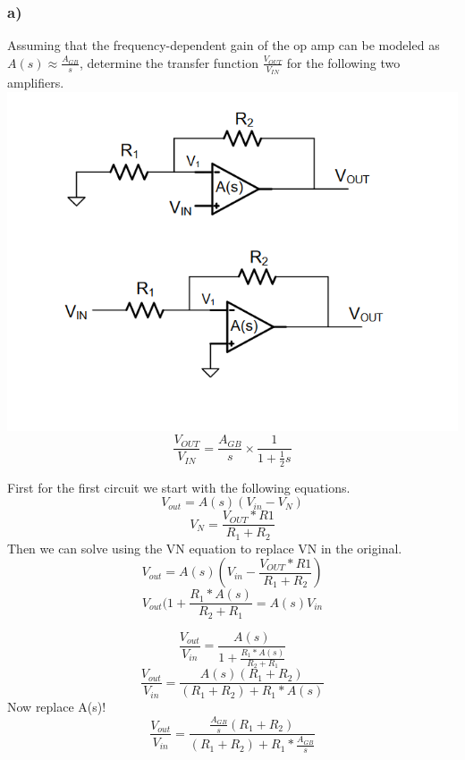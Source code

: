 \documentclass[10pt,a4paper]{article}
\begin{document}
\subsubsection*{a)}
Assuming that the frequency-dependent gain of the op amp can be modeled as
\(A(s) \approx \frac{A_{GB}}{s}\), determine the transfer function
\(\frac{V_{OUT}}{V_{IN}}\) for the following two amplifiers.\\
\includegraphics[width=6in]{images/Problem8.png} \\




\[
\frac{V_{OUT}}{V_{IN}} = \frac{A_{GB}}{s} \times \frac{1}{1 + \frac{1}{2}s}
\]



First for the first circuit we start with the following equations.
\begin{equation}
V_{out} = A(s)(V_{in} - V_N)
\end{equation}
\begin{equation}
V_N = \frac{V_{OUT}*R1}{R_1 + R_2}
\end{equation}
Then we can solve using the VN equation to replace VN in the original.
\begin{equation}
V_{out} = A(s)(V_{in} - \frac{V_{OUT}*R1}{R_1 + R_2})
\end{equation}
\begin{equation}
V_{out}(1 + \frac{R_1 * A(s)}{R_2 + R_1} = A(s)V_{in} 
\end{equation}

\begin{equation}
\frac{V_{out}}{V_{in}} = \frac{A(s)}{1+\frac{R_1 * A(s)}{R_2 + R_1}} 
\end{equation}
\begin{equation}
\frac{V_{out}}{V_{in}} = \frac{A(s)(R_1 + R_2)}{(R_1 + R_2) + R_1 * A(s)} 
\end{equation}
Now replace A(s)!
\begin{equation}
\frac{V_{out}}{V_{in}} = \frac{\frac{A_{GB}}{s}(R_1 + R_2)}{(R_1 + R_2) + R_1 * \frac{A_{GB}}{s}} 
\end{equation}
\end{document}
